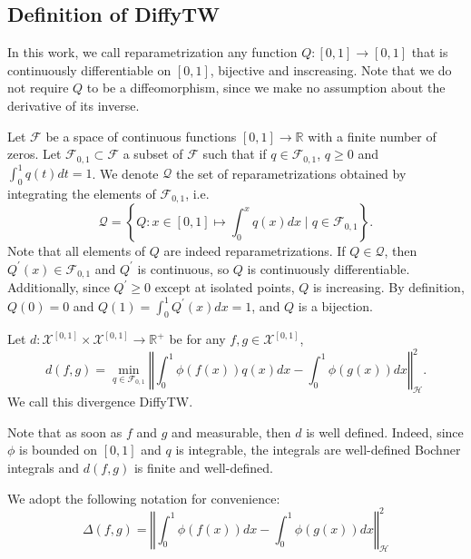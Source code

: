 \subsection{Definition of DiffyTW}
In this work, we call reparametrization any function $Q: [0,1] \to [0,1]$ that is continuously differentiable on $[0,1]$, bijective and inscreasing. Note that we do not require $Q$ to be a diffeomorphism, since we make no assumption about the derivative of its inverse.

Let $\mathcal F$ be a space of continuous functions $[0, 1] \to \mathbb R$ with a finite number of zeros. Let $\mathcal F_{0,1} \subset \mathcal F$ a subset of $\mathcal F$ such that if $q\in\mathcal F_{0,1}$, $q \geq 0$ and $\int_0^1q(t)dt =1$. We denote $\mathcal Q$ the set of reparametrizations obtained by integrating the elements of $\mathcal F_{0,1}$, i.e.
\begin{equation}\label{eq:Q-from-F}
    \mathcal Q = \left\lbrace Q: x\in[0,1] \mapsto \int_0^x q(x)dx \mid q \in \mathcal F_{0,1}\right\rbrace.
\end{equation}
Note that all elements of $Q$ are indeed reparametrizations. If $Q\in\mathcal Q$, then $Q^\prime(x) \in\mathcal F_{0,1}$ and $Q^\prime$ is continuous, so $Q$ is continuously differentiable. Additionally, since $Q^\prime \geq 0$ except at isolated points, $Q$ is increasing. By definition, $Q(0)=0$ and $Q(1)=\int_0^1 Q^\prime(x)dx =1$, and $Q$ is a bijection.

\begin{definition}[DiffyTW]\label{def:diffytw}
Let $d: \mathcal X^{[0,1]} \times \mathcal X^{[0,1]} \to \mathbb R^+$ be for any $f, g\in\mathcal X^{[0,1]}$,
\begin{equation}\label{eq:diffytw}
    d(f, g) = \min_{q \in \mathcal F_{0,1}}\left\Vert \int_0^1 \phi(f(x))q(x)dx - \int_0^1\phi(g(x))dx\right\Vert^2_\mathcal H.
\end{equation}
We call this divergence DiffyTW.
\end{definition}
Note that as soon as $f$ and $g$ and measurable, then $d$ is well defined. Indeed, since $\phi$ is bounded on $[0,1]$ and $q$ is integrable, the integrals are well-defined Bochner integrals and $d(f, g)$ is finite and well-defined.

We adopt the following notation for convenience:
\begin{equation}\label{def:diffytw-delta}
\Delta(f , g) = \left\Vert \int_0^1 \phi(f(x))dx - \int_0^1\phi(g(x))dx\right\Vert^2_\mathcal H
\end{equation}


